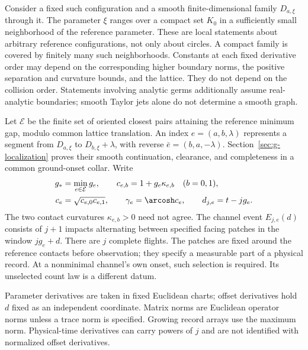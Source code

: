 Consider a fixed such configuration and a smooth finite-dimensional
family $D_{a,\xi}$ through it. The parameter $\xi$ ranges over a compact
set $K_0$ in a sufficiently small neighborhood of the reference parameter.
These are local statements about arbitrary reference configurations,
not only about circles. A compact family is covered by finitely many
such neighborhoods. Constants at each fixed derivative order may depend
on the corresponding higher boundary norms, the positive separation and
curvature bounds, and the lattice. They do not depend on the collision
order. Statements involving analytic germs additionally assume
real-analytic boundaries; smooth Taylor jets alone do not determine a
smooth graph.

Let $\mathcal E$ be the finite set of oriented closest pairs attaining
the reference minimum gap, modulo common lattice translation. An index
$e=(a,b,\lambda)$ represents a segment from $D_{a,\xi}$ to
$D_{b,\xi}+\lambda$, with reverse $\bar e=(b,a,-\lambda)$.
Section~\ref{sec:g-localization} proves their smooth continuation,
clearance, and completeness in a common ground-onset collar. Write
\begin{equation}\label{eq:g-general-data}
 \begin{split}
 g_*&=\min_{e\in\mathcal E}g_e,\qquad
 c_{e,b}=1+g_e\kappa_{e,b}\quad(b=0,1),\\
 c_e&=\sqrt{c_{e,0}c_{e,1}},\qquad
 \gamma_e=\arcosh c_e,\qquad d_{j,e}=t-jg_e.
 \end{split}
\end{equation}
The two contact curvatures $\kappa_{e,b}>0$ need not agree. The channel
event $E_{j,e}(d)$ consists of $j+1$ impacts alternating between specified
facing patches in the window $jg_e+d$. There are $j$ complete flights.
The patches are fixed around the reference contacts before observation;
they specify a measurable part of a physical record. At a nonminimal
channel's own onset, such selection is required. Its unselected count
law is a different datum.

Parameter derivatives are taken in fixed Euclidean charts; offset
derivatives hold $d$ fixed as an independent coordinate. Matrix norms
are Euclidean operator norms unless a trace norm is specified. Growing
record arrays use the maximum norm. Physical-time derivatives can carry
powers of $j$ and are not identified with normalized offset derivatives.

